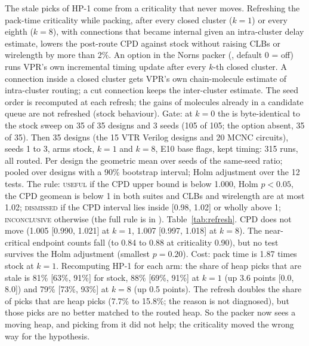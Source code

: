  The stale picks of HP-1 come from a criticality that never moves. Refreshing the pack-time criticality while packing, after every closed cluster ($k=1$) or every eighth ($k=8$), with connections that became internal given an intra-cluster delay estimate, lowers the post-route CPD against stock without raising CLBs or wirelength by more than 2\%.
 An option in the Norns packer (, default 0 = off) runs VPR's own incremental timing update after every $k$-th closed cluster. A connection inside a closed cluster gets VPR's own chain-molecule estimate of intra-cluster routing; a cut connection keeps the inter-cluster estimate. The seed order is recomputed at each refresh; the gains of molecules already in a candidate queue are not refreshed (stock behaviour). Gate: at $k=0$ the  is byte-identical to the stock sweep on 35 of 35 designs and 3 seeds (105 of 105; the option absent, 35 of 35). Then 35 designs (the 15 VTR Verilog designs and 20 MCNC circuits), seeds 1 to 3, arms stock, $k=1$ and $k=8$, E10 base flags, kept timing: 315 runs, all routed. Per design the geometric mean over seeds of the same-seed ratio; pooled over designs with a 90\% bootstrap interval; Holm adjustment over the 12 tests. The rule: \textsc{useful} if the CPD upper bound is below 1.000, Holm $p<0.05$, the CPD geomean is below 1 in both suites and CLBs and wirelength are at most 1.02; \textsc{dismissed} if the CPD interval lies inside [0.98, 1.02] or wholly above 1; \textsc{inconclusive} otherwise (the full rule is in ).
 Table~\ref{tab:refresh}. CPD does not move (1.005 [0.990, 1.021] at $k=1$, 1.007 [0.997, 1.018] at $k=8$). The near-critical endpoint counts fall (to 0.84 to 0.88 at criticality 0.90), but no test survives the Holm adjustment (smallest $p=0.20$). Cost: pack time is 1.87 times stock at $k=1$.
 Recomputing HP-1 for each arm: the share of heap picks that are stale is 81\% [63\%, 91\%] for stock, 88\% [69\%, 91\%] at $k=1$ (up 3.6 points [0.0, 8.0]) and 79\% [73\%, 93\%] at $k=8$ (up 0.5 points). The refresh doubles the share of picks that are heap picks (7.7\% to 15.8\%; the reason is not diagnosed), but those picks are no better matched to the routed heap. So the packer now sees a moving heap, and picking from it did not help; the criticality moved the wrong way for the hypothesis.

